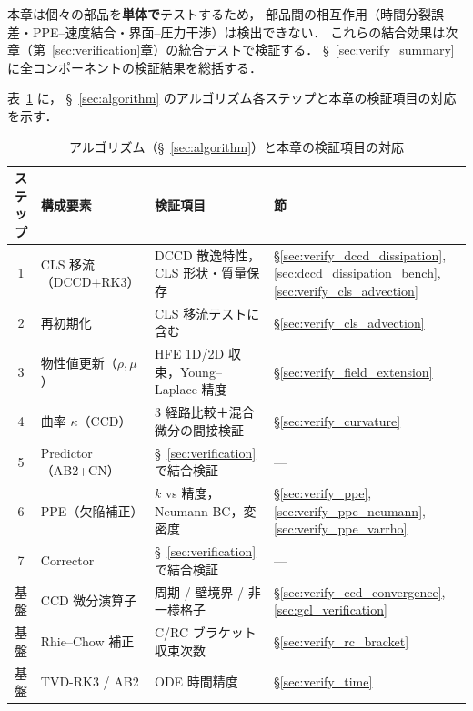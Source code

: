 \noindent
本章は個々の部品を\textbf{単体で}テストするため，
部品間の相互作用（時間分裂誤差・PPE--速度結合・界面--圧力干渉）は検出できない．
これらの結合効果は次章（第~\ref{sec:verification}章）の統合テストで検証する．
§~\ref{sec:verify_summary} に全コンポーネントの検証結果を総括する．

表~\ref{tab:component_algorithm_map} に，
§~\ref{sec:algorithm} のアルゴリズム各ステップと本章の検証項目の対応を示す．

\begin{table}[htbp]
\centering
\caption{アルゴリズム（§~\ref{sec:algorithm}）と本章の検証項目の対応}
\label{tab:component_algorithm_map}
\renewcommand{\arraystretch}{1.3}
\small
\begin{tabular}{clp{4.2cm}p{4.0cm}}
\toprule
ステップ & 構成要素 & 検証項目 & 節 \\
\midrule
1 & CLS 移流（DCCD+RK3） & DCCD 散逸特性，CLS 形状・質量保存 & §\ref{sec:verify_dccd_dissipation}, \ref{sec:dccd_dissipation_bench}, \ref{sec:verify_cls_advection} \\
2 & 再初期化 & CLS 移流テストに含む & §\ref{sec:verify_cls_advection} \\
3 & 物性値更新（$\rho, \mu$） & HFE 1D/2D 収束，Young--Laplace 精度 & §\ref{sec:verify_field_extension} \\
4 & 曲率 $\kappa$（CCD） & 3 経路比較＋混合微分の間接検証 & §\ref{sec:verify_curvature} \\
5 & Predictor（AB2+CN） & §~\ref{sec:verification} で結合検証 & — \\
6 & PPE（欠陥補正） & $k$ vs 精度，Neumann BC，変密度 & §\ref{sec:verify_ppe}, \ref{sec:verify_ppe_neumann}, \ref{sec:verify_ppe_varrho} \\
7 & Corrector & §~\ref{sec:verification} で結合検証 & — \\
\midrule
基盤 & CCD 微分演算子 & 周期 / 壁境界 / 非一様格子 & §\ref{sec:verify_ccd_convergence}, \ref{sec:gcl_verification} \\
基盤 & Rhie--Chow 補正 & C/RC ブラケット収束次数 & §\ref{sec:verify_rc_bracket} \\
基盤 & TVD-RK3 / AB2 & ODE 時間精度 & §\ref{sec:verify_time} \\
\bottomrule
\end{tabular}
\end{table}

